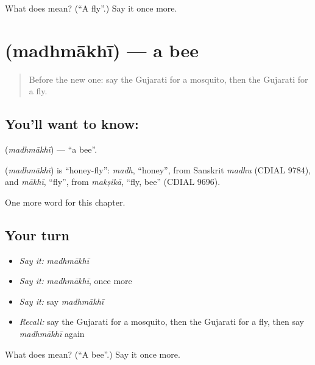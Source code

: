 \begin{tcolorbox}[breakable,colback=teal!4,colframe=teal!35!black,title={Before you move on}]
What does  mean? (\textquotedblleft{}A fly\textquotedblright{}.) Say it once more.
\end{tcolorbox}
\section[\texorpdfstring{\gu{મધમાખી} (madhmākhī)}{મધમાખી (madhmākhī)}]{ (madhmākhī) — a bee}

\label{lesson:GU-C123-madhmakhi}



\begin{quote}
Before the new one: say the Gujarati for a mosquito, then the Gujarati for a fly.
\end{quote}

\subsection*{You'll want to know: }
\textbf{} (\emph{madhmākhī}) — \textquotedblleft{}a bee\textquotedblright{}.

\begin{cousinweb}
\textbf{} (\emph{madhmākhī}) is \textquotedblleft{}honey-fly\textquotedblright{}: \emph{madh}, \textquotedblleft{}honey\textquotedblright{}, from Sanskrit \emph{madhu} (CDIAL 9784), and \emph{mākhī}, \textquotedblleft{}fly\textquotedblright{}, from \emph{makṣikā}, \textquotedblleft{}fly, bee\textquotedblright{} (CDIAL 9696).
\end{cousinweb}

\begin{grammarlens}[title={What you've built}]
One more word for this chapter.
\end{grammarlens}

\subsection*{Your turn}
\begin{itemize}
\raggedright
  \item \emph{Say it:} \emph{madhmākhī}
  \item \emph{Say it:} \emph{madhmākhī}, once more
  \item \emph{Say it:} say \emph{madhmākhī}
  \item \emph{Recall:} say the Gujarati for a mosquito, then the Gujarati for a fly, then say \emph{madhmākhī} again
\end{itemize}

\begin{tcolorbox}[breakable,colback=teal!4,colframe=teal!35!black,title={Before you move on}]
What does  mean? (\textquotedblleft{}A bee\textquotedblright{}.) Say it once more.
\end{tcolorbox}
